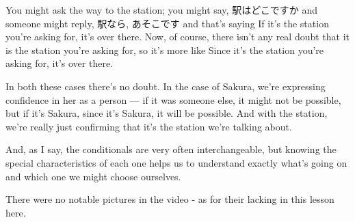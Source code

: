 You might ask the way to the station; you might say, 駅はどこですか and someone might reply, 駅なら, あそこです and that's saying If it's the station you're asking for, it's over there. Now, of course, there isn't any real doubt that it is the station you're asking for, so it's more like Since it's the station you're asking for, it's over there.

In both these cases there's no doubt. In the case of Sakura, we're expressing confidence in her as a person --- if it was someone else, it might not be possible, but if it's Sakura, since it's Sakura, it will be possible. And with the station, we're really just confirming that it's the station we're talking about.

And, as I say, the conditionals are very often interchangeable, but knowing the special characteristics of each one helps us to understand exactly what's going on and which one we might choose ourselves.

There were no notable pictures in the video - as for their lacking in this lesson here.

\stopsectionlevel

\stopsectionlevel

